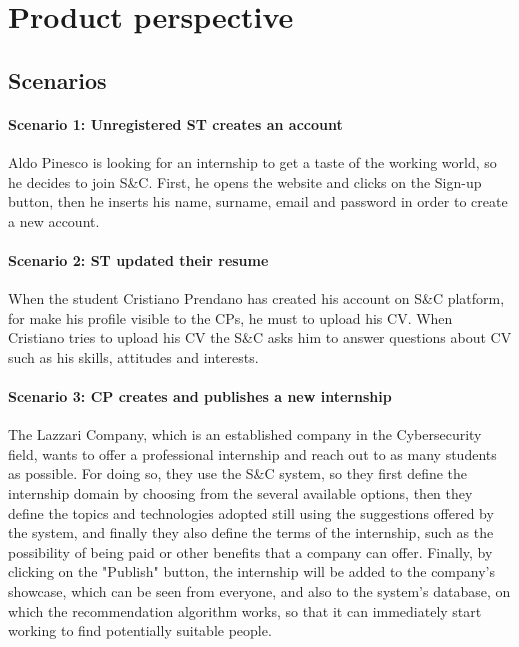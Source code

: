 \section{Product perspective}
\label{sec:product_perspective}%

\subsection{Scenarios}
\label{subsec:scenarios}%
\paragraph{Scenario 1: Unregistered ST creates an account}
Aldo Pinesco is looking for an internship to get a taste of the working world, so he decides to join S\&C. First, he opens the website and clicks on the Sign-up button, then he inserts his name, surname, email and password in order to create a new account.

\paragraph{Scenario 2: ST updated their resume}
When the student Cristiano Prendano has created his account on S\&C platform, for make his profile visible to the CPs, he must to upload his CV. 
When Cristiano tries to upload his CV the S\&C asks him to answer questions about CV such as his skills, attitudes and interests.

\paragraph{Scenario 3: CP creates and publishes a new internship}
The Lazzari Company, which is an established company in the Cybersecurity field, wants to offer a professional internship and reach out to as many students as possible. For doing so, they use the S\&C system, so they first define the internship domain by choosing from the several available options, then they define the topics and technologies adopted still using the suggestions offered by the system, and finally they also define the terms of the internship, such as the possibility of being paid or other benefits that a company can offer. Finally, by clicking on the "Publish" button, the internship will be added to the company's showcase, which can be seen from everyone, and also to the system's database, on which the recommendation algorithm works, so that it can immediately start working to find potentially suitable people.

